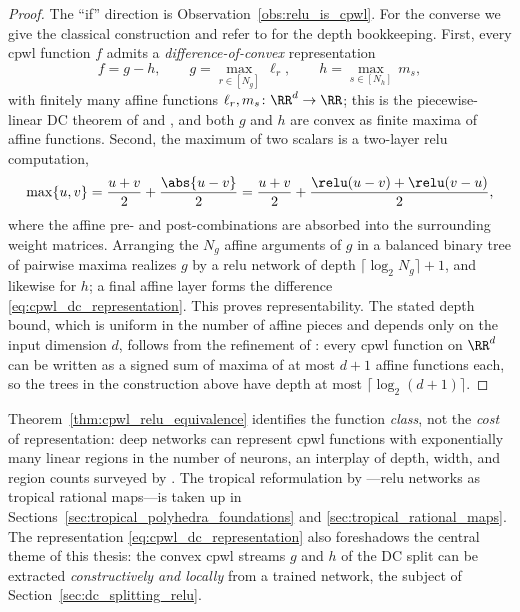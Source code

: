 \begin{proof}
The ``if'' direction is Observation~\ref{obs:relu_is_cpwl}. For the converse we give the classical construction and refer to \textcite{Arora2018} for the depth bookkeeping. First, every \ac{cpwl} function $f$ admits a \emph{difference-of-convex} representation
\begin{equation}
	f = g - h,
	\qquad
	g = \max_{r \in [N_g]}\, \ell_r,
	\qquad
	h = \max_{s \in [N_h]}\, m_s,
	\label{eq:cpwl_dc_representation}
\end{equation}
with finitely many affine functions $\ell_r, m_s \colon \RR^d \to \RR$; this is the piecewise-linear DC theorem of \textcite{Melzer1986_PLasDC} and \textcite{Kripfganz1987_PWAasDC}, and both $g$ and $h$ are convex as finite maxima of affine functions. Second, the maximum of two scalars is a two-layer \ac{relu} computation,
\begin{equation}
	\max\{u, v\}
	= \frac{u + v}{2} + \frac{\abs{u - v}}{2}
	= \frac{u + v}{2} + \frac{\relu(u - v) + \relu(v - u)}{2},
	\label{eq:max_as_relu}
\end{equation}
where the affine pre- and post-combinations are absorbed into the surrounding weight matrices. Arranging the $N_g$ affine arguments of $g$ in a balanced binary tree of pairwise maxima realizes $g$ by a \ac{relu} network of depth $\lceil \log_2 N_g \rceil + 1$, and likewise for $h$; a final affine layer forms the difference \eqref{eq:cpwl_dc_representation}. This proves representability. The stated depth bound, which is uniform in the number of affine pieces and depends only on the input dimension $d$, follows from the refinement of \textcite{Arora2018}: every \ac{cpwl} function on $\RR^d$ can be written as a signed sum of maxima of at most $d + 1$ affine functions each, so the trees in the construction above have depth at most $\lceil \log_2(d+1) \rceil$.
\end{proof}

\begin{remark}\label{rem:linear_regions}
Theorem~\ref{thm:cpwl_relu_equivalence} identifies the function \emph{class}, not the \emph{cost} of representation: deep networks can represent \ac{cpwl} functions with exponentially many linear regions in the number of neurons, an interplay of depth, width, and region counts surveyed by \textcite{huchette2025deeplearningmeetspolyhedral}. The tropical reformulation by \textcite{Zhang2018}---\ac{relu} networks as tropical rational maps---is taken up in Sections~\ref{sec:tropical_polyhedra_foundations} and \ref{sec:tropical_rational_maps}. The representation \eqref{eq:cpwl_dc_representation} also foreshadows the central theme of this thesis: the convex \ac{cpwl} streams $g$ and $h$ of the DC split can be extracted \emph{constructively and locally} from a trained network, the subject of Section~\ref{sec:dc_splitting_relu}.
\end{remark}

